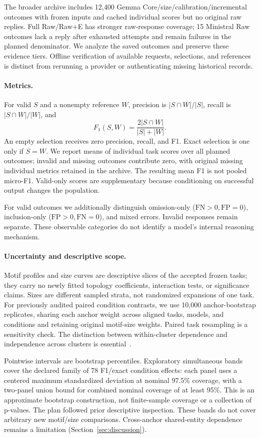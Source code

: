 The broader archive includes 12,400 Gemma Core/size/calibration/incremental outcomes with frozen inputs and cached individual scores but no original raw replies. Full Raw/Raw+E has stronger raw-response coverage; 15 Ministral Raw outcomes lack a reply after exhausted attempts and remain failures in the planned denominator. We analyze the saved outcomes and preserve these evidence tiers. Offline verification of available requests, selections, and references is distinct from rerunning a provider or authenticating missing historical records.

\paragraph{Metrics.}
For valid $S$ and a nonempty reference $W$, precision is $|S\cap W|/|S|$, recall is $|S\cap W|/|W|$, and
\begin{equation}
 F_1(S,W)=\frac{2|S\cap W|}{|S|+|W|}.
\end{equation}
An empty selection receives zero precision, recall, and F1. Exact selection is one only if $S=W$. We report means of individual task scores over all planned outcomes; invalid and missing outcomes contribute zero, with original missing individual metrics retained in the archive. The resulting mean F1 is not pooled micro-F1. Valid-only scores are supplementary because conditioning on successful output changes the population.

For valid outcomes we additionally distinguish omission-only ($\mathrm{FN}>0,\mathrm{FP}=0$), inclusion-only ($\mathrm{FP}>0,\mathrm{FN}=0$), and mixed errors. Invalid responses remain separate. These observable categories do not identify a model's internal reasoning mechanism.

\paragraph{Uncertainty and descriptive scope.}
Motif profiles and size curves are descriptive slices of the accepted frozen tasks; they carry no newly fitted topology coefficients, interaction tests, or significance claims. Sizes are different sampled strata, not randomized expansions of one task. For previously audited paired condition contrasts, we use 10,000 anchor-bootstrap replicates, sharing each anchor weight across aligned tasks, models, and conditions and retaining original motif-size weights. Paired task resampling is a sensitivity check. The distinction between within-cluster dependence and independence across clusters is essential~\cite{cameron2015clusters}.

Pointwise intervals are bootstrap percentiles. Exploratory simultaneous bands cover the declared family of 78 F1/exact condition effects: each panel uses a centered maximum standardized deviation at nominal 97.5\% coverage, with a two-panel union bound for combined nominal coverage of at least 95\%. This is an approximate bootstrap construction, not finite-sample coverage or a collection of p-values. The plan followed prior descriptive inspection. These bands do not cover arbitrary new motif/size comparisons. Cross-anchor shared-entity dependence remains a limitation (Section~\ref{sec:discussion}).
